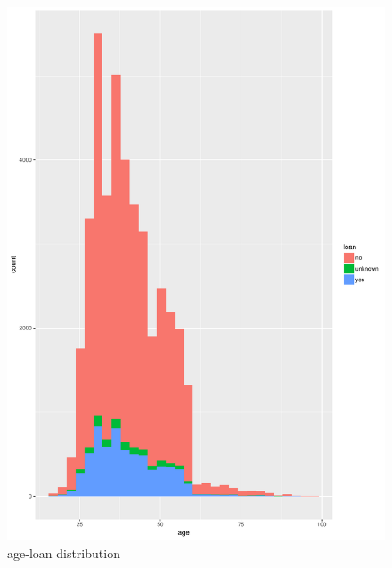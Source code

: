 \documentclass[12pt, a4paper, bibliography=totoc, english]{scrartcl}
\begin{document}
\begin{figure}
	\centering
	\includegraphics[width=0.7\linewidth]{Plot8}
	\caption{age-loan distribution}
	\label{fig:plot8}
\end{figure}
\end{document}
